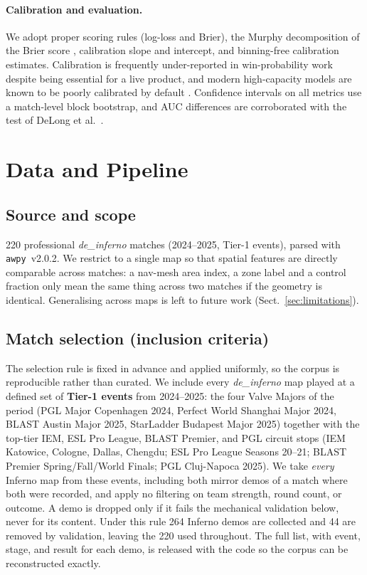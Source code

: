 \documentclass[11pt,a4paper]{article}
\begin{document}
\paragraph{Calibration and evaluation.}
We adopt proper scoring rules (log-loss and Brier), the Murphy decomposition of the Brier
score \cite{murphy1973vector}, calibration slope and intercept, and binning-free calibration
estimates. Calibration is frequently under-reported in win-probability work despite being
essential for a live product, and modern high-capacity models are known to be poorly
calibrated by default \cite{guo2017calibration}. Confidence intervals on all metrics use a
match-level block bootstrap, and AUC differences are corroborated with the test of DeLong
et al.\ \cite{delong1988comparing}.

\section{Data and Pipeline}
\label{sec:data}

\subsection{Source and scope}
220 professional \textit{de\_inferno} matches (2024--2025, Tier-1 events), parsed with
\texttt{awpy}~v2.0.2. We restrict to a single map so that spatial features are directly
comparable across matches: a nav-mesh area index, a zone label and a control fraction
only mean the same thing across two matches if the geometry is identical. Generalising
across maps is left to future work (Sect.~\ref{sec:limitations}).

\subsection{Match selection (inclusion criteria)}
\label{sec:selection}
The selection rule is fixed in advance and applied uniformly, so the corpus is reproducible
rather than curated. We include every \textit{de\_inferno} map played at a defined set of
\textbf{Tier-1 events} from 2024--2025: the four Valve Majors of the period (PGL Major
Copenhagen 2024, Perfect World Shanghai Major 2024, BLAST Austin Major 2025, StarLadder
Budapest Major 2025) together with the top-tier IEM, ESL Pro League, BLAST Premier, and PGL
circuit stops (IEM Katowice, Cologne, Dallas, Chengdu; ESL Pro League Seasons 20--21; BLAST
Premier Spring/Fall/World Finals; PGL Cluj-Napoca 2025). We take \emph{every} Inferno map
from these events, including both mirror demos of a match where both were recorded, and apply
no filtering on team strength, round count, or outcome. A demo is dropped only if it fails
the mechanical validation below, never for its content. Under this rule 264 Inferno demos are
collected and 44 are removed by validation, leaving the 220 used throughout. The full list,
with event, stage, and result for each demo, is released with the code so the corpus can be
reconstructed exactly.
\end{document}
